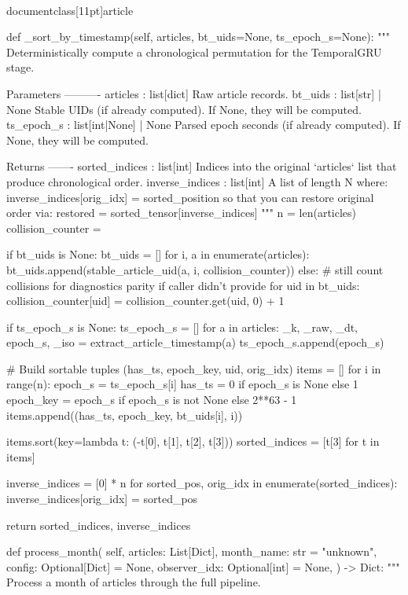 \\documentclass[11pt]{article}
\begin{document}
\begin{CodeBlock}
    def _sort_by_timestamp(self, articles, bt_uids=None, ts_epoch_s=None):
        """
        Deterministically compute a chronological permutation for the TemporalGRU stage.

        Parameters
        ----------
        articles : list[dict]
            Raw article records.
        bt_uids : list[str] | None
            Stable UIDs (if already computed). If None, they will be computed.
        ts_epoch_s : list[int|None] | None
            Parsed epoch seconds (if already computed). If None, they will be computed.

        Returns
        -------
        sorted_indices : list[int]
            Indices into the original `articles` list that produce chronological order.
        inverse_indices : list[int]
            A list of length N where:
                inverse_indices[orig_idx] = sorted_position
            so that you can restore original order via:
                restored = sorted_tensor[inverse_indices]
        """
        n = len(articles)
        collision_counter = {}

        if bt_uids is None:
            bt_uids = []
            for i, a in enumerate(articles):
                bt_uids.append(stable_article_uid(a, i, collision_counter))
        else:
            # still count collisions for diagnostics parity if caller didn't provide
            for uid in bt_uids:
                collision_counter[uid] = collision_counter.get(uid, 0) + 1

        if ts_epoch_s is None:
            ts_epoch_s = []
            for a in articles:
                _k, _raw, _dt, epoch_s, _iso = extract_article_timestamp(a)
                ts_epoch_s.append(epoch_s)

        # Build sortable tuples (has_ts, epoch_key, uid, orig_idx)
        items = []
        for i in range(n):
            epoch_s = ts_epoch_s[i]
            has_ts = 0 if epoch_s is None else 1
            epoch_key = epoch_s if epoch_s is not None else 2**63 - 1
            items.append((has_ts, epoch_key, bt_uids[i], i))

        items.sort(key=lambda t: (-t[0], t[1], t[2], t[3]))
        sorted_indices = [t[3] for t in items]

        inverse_indices = [0] * n
        for sorted_pos, orig_idx in enumerate(sorted_indices):
            inverse_indices[orig_idx] = sorted_pos

        return sorted_indices, inverse_indices

    def process_month(
        self, 
        articles: List[Dict], 
        month_name: str = "unknown", 
        config: Optional[Dict] = None,
        observer_idx: Optional[int] = None,
    ) -> Dict:
        """
        Process a month of articles through the full pipeline.


\end{CodeBlock}
\end{document}
